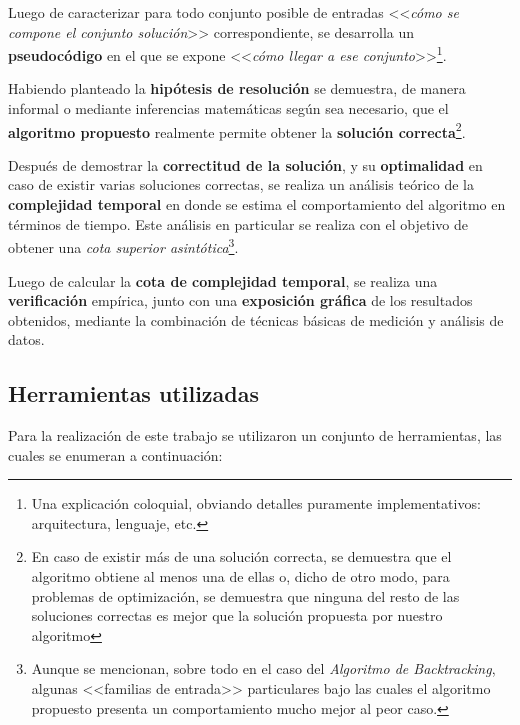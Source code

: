 \documentclass[11pt, a4paper, twoside]{article}
\begin{document}
Luego de caracterizar para todo conjunto posible de entradas <<\textit{cómo se compone el conjunto solución}>> correspondiente, se desarrolla un \textbf{pseudocódigo} en el que se expone <<\textit{cómo llegar a ese conjunto}>>\footnote{Una explicación coloquial, obviando detalles puramente implementativos: arquitectura, lenguaje, etc.}.

Habiendo planteado la \textbf{hipótesis de resolución} se demuestra, de manera informal o mediante inferencias matemáticas según sea necesario, que el \textbf{algoritmo propuesto} realmente permite obtener la \textbf{solución correcta}\footnote{En caso de existir más de una solución correcta, se demuestra que el algoritmo obtiene al menos una de ellas o, dicho de otro modo, para problemas de optimización, se demuestra que ninguna del resto de las soluciones correctas es mejor que la solución propuesta por nuestro algoritmo}.

Después de demostrar la \textbf{correctitud de la solución}, y su \textbf{optimalidad} en caso de existir varias soluciones correctas, se realiza un análisis teórico de la \textbf{complejidad temporal} en donde se estima el comportamiento del algoritmo en términos de tiempo. Este análisis en particular se realiza con el objetivo de obtener una \textit{cota superior asintótica}\footnote{Aunque se mencionan, sobre todo en el caso del \textit{Algoritmo de Backtracking}, algunas <<familias de entrada>> particulares bajo las cuales el algoritmo propuesto presenta un comportamiento mucho mejor al peor caso.}.

Luego de calcular la \textbf{cota de complejidad temporal}, se realiza una \textbf{verificación} empírica, junto con una \textbf{exposición gráfica} de los resultados obtenidos, mediante la combinación de técnicas básicas de medición y análisis de datos.

\newpage
\subsection{Herramientas utilizadas}
Para la realización de este trabajo se utilizaron un conjunto de herramientas, las cuales se enumeran a continuación:
\end{document}
